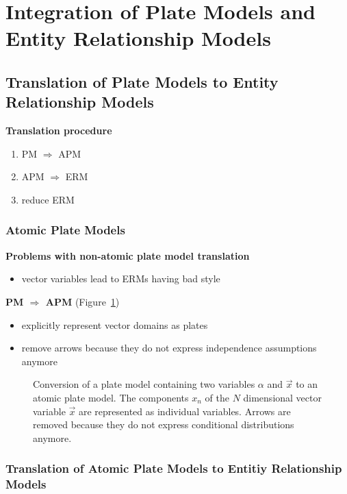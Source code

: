 \section{Integration of Plate Models and Entity Relationship Models}

\subsection{Translation of Plate Models to Entity Relationship Models}

\textbf{Translation procedure}
\begin{enumerate}
\item PM $\Rightarrow$ APM
\item APM $\Rightarrow$ ERM
\item reduce ERM
\end{enumerate}

\subsubsection{Atomic Plate Models}

\textbf{Problems with non-atomic plate model translation}
\begin{itemize}
\item vector variables lead to ERMs having bad style
\end{itemize}

\textbf{PM $\Rightarrow$ APM} (Figure~\ref{fig:pm2apm})
\begin{itemize}
\item explicitly represent vector domains as plates
\item remove arrows because they do not express independence assumptions anymore
\end{itemize}

\begin{figure}
\centering
\scalebox{\tikzScale}{\adjustTikzSize }
\caption{Conversion of a plate model containing two variables $\alpha$ and $\vec x$ to an atomic plate model. The components $x_n$ of the $N$ dimensional vector variable $\vec x$ are represented as individual variables. Arrows are removed because they do not express conditional distributions anymore.}\label{fig:pm2apm}
\end{figure}

\subsubsection{Translation of Atomic Plate Models to Entitiy Relationship Models}

